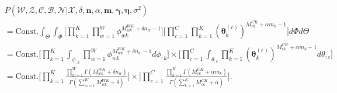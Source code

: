 \documentclass[a4paper]{article}
\begin{document}
\begin{equation}
\begin{aligned}
&P(\mathcal{W}, \mathcal{Z}, \mathcal{C}, \mathcal{B}, \mathcal{N}| \mathcal{X}, \delta, \boldsymbol{n}, \alpha, \boldsymbol{m}, \boldsymbol{\gamma}, \boldsymbol{\eta}, \sigma^2)\\&=\mbox{Const.}\int_{\Theta}\int_{\Phi}\Big[\prod_{k=1}^{K}\prod_{w=1}^{W}\phi_{wk}^{M^{WK}_{wk}+\delta n_w-1}\Big]\Big[\prod_{c=1}^{C}\prod_{k=1}^{K}(\boldsymbol{\theta}^{(c)}_{k})^{M^{CK}_{ck}+\alpha m_k-1}\Big]d\Phi d\Theta
\\&=\mbox{Const.}\Big[\prod_{k=1}^{K}\int_{\phi_{:k}}\prod_{w=1}^{W}\phi_{wk}^{M^{WK}_{wk}+\delta n_w-1  }d\phi_{:k}\Big]\times\Big[\prod_{c=1}^{C}\int_{\theta_{:c}}\prod_{k=1}^{K}(\boldsymbol{\theta}^{(c)}_{k})^{M^{CK}_{ck}+\alpha m_k-1}d\theta_{:c}\Big]
\\&=\mbox{Const.}\Big[\prod_{k=1}^{K}\frac{\prod_{w=1}^W\Gamma(M_{wk}^{WK}+\delta n_w)}{\Gamma(\sum_{w=1}^WM_{wk}^{WK}+\delta )}\Big]\times\Big[\prod_{c=1}^{C}\frac{\prod_{k=1}^K\Gamma(M^{CK}_{ck}+\alpha m_k)}{\Gamma(\sum_{k=1}^KM^{CK}_{ck}+\alpha)}\Big].
\end{aligned}
\end{equation}
\end{document}
